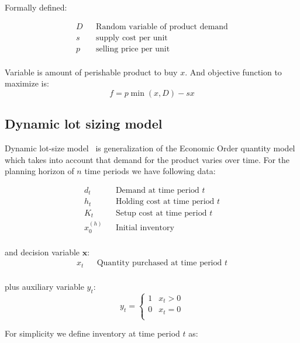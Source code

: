 Formally defined:

\begin{align*}
    D && \text{Random variable of product demand} \\
    s && \text{supply cost per unit} \\
    p && \text{selling price per unit} \\
\end{align*}

Variable is amount of perishable product to buy $x$.
And objective function to maximize is:
\begin{equation*}
    f = p\min(x, D) - sx
\end{equation*}

\subsection{Dynamic lot sizing model}
\label{sec:Dynamic lot sizing model}

Dynamic lot-size model~\cite{Wagner2004} is generalization of the Economic Order quantity model~\cite{Harris1990} which takes into account that demand for the product varies over time. For the planning horizon of $n$ time periods we have following data:

\begin{align*}
  d_t && \text{Demand at time period $t$} \\
  h_t && \text{Holding cost at time period $t$} \\
  K_t && \text{Setup cost at time period $t$} \\
  x^{(h)}_0 && \text{Initial inventory} \\
\end{align*}

and decision variable $\mathbf{x}$:
\begin{align*}
  x_t && \text{Quantity purchased at time period $t$}\\
\end{align*}

plus auxiliary variable $y_t$:
\begin{equation*}
    y_t = \begin{cases}
        1 & x_t > 0\\
        0 & x_t = 0 \\
    \end{cases}
\end{equation*}

For simplicity we define inventory at time period $t$ as:

